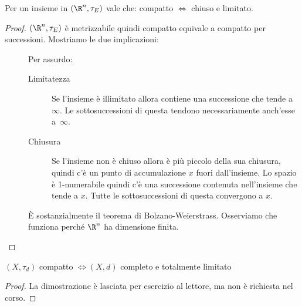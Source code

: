 \begin{prop}
	Per un insieme in $(\R^n,\tau_E)$ vale che: compatto $\iff$ chiuso e limitato.
\end{prop}

\begin{proof}
	$(\R^n,\tau_E)$ è metrizzabile quindi compatto equivale a compatto per successioni.
	Mostriamo le due implicazioni:
	\begin{description}
		\item[\proofrightarrow]
			Per assurdo:
			\begin{description}
				\item[Limitatezza]
				Se l'insieme è illimitato allora contiene una successione che tende a~$\infty$.
				Le sottosuccessioni di questa tendono necessariamente anch'esse a~$\infty$.
				\item[Chiusura]
				Se l'insieme non è chiuso allora è più piccolo della sua chiusura, quindi c'è un punto di accumulazione $x$ fuori dall'insieme.
				Lo spazio è \mbox{1-numerabile} quindi c'è una successione contenuta nell'insieme che tende a $x$.
				Tutte le sottosuccessioni di questa convergono a $x$.
			\end{description}
		\item[\proofleftarrow]
			È sostanzialmente il teorema di Bolzano-Weierstrass.
			Osserviamo che funziona perché $\R^n$ ha dimensione finita.
		\qedhere
	\end{description}
\end{proof}

\begin{teo}
	$(X,\tau _d)$ compatto $\iff (X,d)$ completo e totalmente limitato
\end{teo}

\begin{proof}
	La dimostrazione è lasciata per esercizio al lettore, ma non è richiesta nel corso.
\end{proof}
